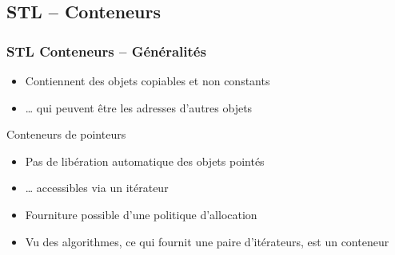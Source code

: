 \documentclass[C++.tex]{subfiles}
\begin{document}
\subsection*{STL -- Conteneurs}
\begin{frame}[fragile]
	\frametitle{STL Conteneurs -- Généralités}
	\begin{itemize}
		\item Contiennent des objets copiables et non constants


		\item \ldots{} qui peuvent être les adresses d'autres objets
	\end{itemize}

	\begin{alertblock}{Conteneurs de pointeurs}
		\begin{itemize}
			\item Pas de libération automatique des objets pointés
		\end{itemize}
	\end{alertblock}

	\begin{itemize}
		\item \ldots{} accessibles via un itérateur
		\item Fourniture possible d'une politique d'allocation
		\item Vu des algorithmes, ce qui fournit une paire d'itérateurs, est un conteneur
	\end{itemize}
\end{frame}
\end{document}
